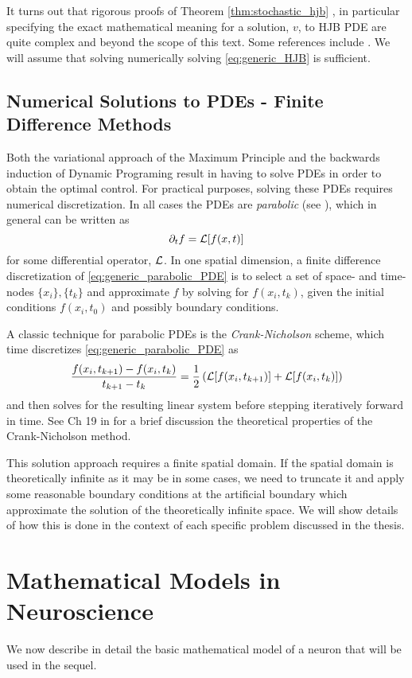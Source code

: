 It turns out that rigorous proofs of Theorem
\ref{thm:stochastic_hjb} , in particular specifying the exact
mathematical meaning for a solution, $v$, to HJB PDE are quite complex and beyond the scope
of this text. Some references include \cite{Krylov2008,Fleming2006}. We will
assume that solving numerically solving \cref{eq:generic_HJB} is sufficient. 

\subsection{Numerical Solutions to PDEs - Finite Difference Methods}
Both the variational approach of the Maximum Principle and the backwards
induction of Dynamic Programing result in having to solve PDEs in order to
obtain the optimal control. For practical purposes, solving these PDEs requires
numerical discretization. In all cases the PDEs are {\sl
parabolic} (see \cite{Press1992}), which in general can be written as 
\begin{equation}
{\partial}_t f = { \mathcal{L} }[f(x,t)]
\label{eq:generic_parabolic_PDE}
\end{equation}
for some differential operator, ${ \mathcal{L} }$. 
In one spatial dimension, a finite difference discretization of
\cref{eq:generic_parabolic_PDE} is to select a set of space- and time- nodes
$\{x_i\}, \{t_k\}$ and approximate $f$ by solving for $f(x_i, t_k)$, given the
initial conditions $f(x_i, t_0)$ and possibly boundary conditions.

A classic technique for parabolic PDEs is the
{\sl Crank-Nicholson} scheme, which time discretizes
\cref{eq:generic_parabolic_PDE} as
$$
\frac{f(x_i, t_{k+1})- f(x_i, t_k)}{ t_{k+1}-t_k}
=
\frac 12 \left({ \mathcal{L} }[f(x_i, t_{k+1}  )] + { \mathcal{L} }[f(x_i, t_k)]
\right)
$$
and then solves for the resulting linear system before stepping
iteratively forward in time. See Ch 19 in \cite{Press1992} for a brief
discussion the theoretical properties of the Crank-Nicholson method.   

This solution approach requires a finite spatial domain. If the spatial domain
is theoretically infinite as it may be in some cases, we need to truncate it and
apply some reasonable boundary conditions at the artificial boundary which
approximate the solution of the theoretically infinite space. We will show
details of how this is done in the context of each specific problem
discussed in the thesis.  
 
\section{Mathematical Models in Neuroscience}
\label{sec:math_models_in_neuroscience}
We now describe in detail the basic mathematical model of a neuron that will be
used in the sequel. 

